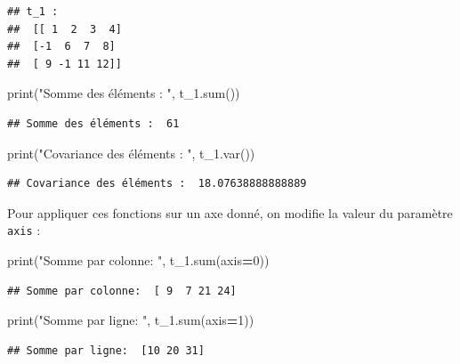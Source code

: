 \documentclass[
  12pt,
]{book}
\newenvironment{Shaded}{\begin{snugshade}}{\end{snugshade}}
\newcommand{\BuiltInTok}[1]{#1}
\newcommand{\DecValTok}[1]{\textcolor[rgb]{0.00,0.00,0.81}{#1}}
\newcommand{\NormalTok}[1]{#1}
\newcommand{\OperatorTok}[1]{\textcolor[rgb]{0.81,0.36,0.00}{\textbf{#1}}}
\newcommand{\StringTok}[1]{\textcolor[rgb]{0.31,0.60,0.02}{#1}}
\numberwithin{equation}{section}
\numberwithin{countremarque}{section}
\begin{document}
\begin{lstlisting}
## t_1 : 
##  [[ 1  2  3  4]
##  [-1  6  7  8]
##  [ 9 -1 11 12]]
\end{lstlisting}

\begin{Shaded}
\begin{Highlighting}[]
\BuiltInTok{print}\NormalTok{(}\StringTok{"Somme des éléments : "}\NormalTok{, t\_1.}\BuiltInTok{sum}\NormalTok{())}
\end{Highlighting}
\end{Shaded}

\begin{lstlisting}
## Somme des éléments :  61
\end{lstlisting}

\begin{Shaded}
\begin{Highlighting}[]
\BuiltInTok{print}\NormalTok{(}\StringTok{"Covariance des éléments : "}\NormalTok{, t\_1.var())}
\end{Highlighting}
\end{Shaded}

\begin{lstlisting}
## Covariance des éléments :  18.07638888888889
\end{lstlisting}

Pour appliquer ces fonctions sur un axe donné, on modifie la valeur du paramètre \texttt{axis} :

\begin{Shaded}
\begin{Highlighting}[]
\BuiltInTok{print}\NormalTok{(}\StringTok{"Somme par colonne: "}\NormalTok{, t\_1.}\BuiltInTok{sum}\NormalTok{(axis}\OperatorTok{=}\DecValTok{0}\NormalTok{))}
\end{Highlighting}
\end{Shaded}

\begin{lstlisting}
## Somme par colonne:  [ 9  7 21 24]
\end{lstlisting}

\begin{Shaded}
\begin{Highlighting}[]
\BuiltInTok{print}\NormalTok{(}\StringTok{"Somme par ligne: "}\NormalTok{, t\_1.}\BuiltInTok{sum}\NormalTok{(axis}\OperatorTok{=}\DecValTok{1}\NormalTok{))}
\end{Highlighting}
\end{Shaded}

\begin{lstlisting}
## Somme par ligne:  [10 20 31]
\end{lstlisting}
\end{document}
